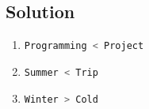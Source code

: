 \documentclass[a4paper, 10pt]{article}
\begin{document}
    \subsection{Solution}
      \begin{enumerate}[label=\alph*.]
          \item \lstinline[language=bash,columns=fixed]{Programming < Project}
          \item \lstinline[language=bash,columns=fixed]{Summer < Trip}
          \item \lstinline[language=bash,columns=fixed]{Winter > Cold}
      \end{enumerate}

\end{document}

